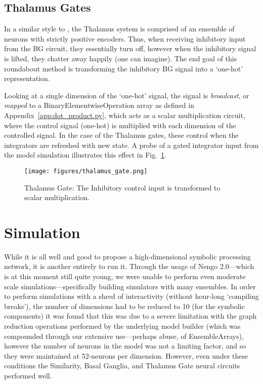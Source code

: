 \documentclass{report}
\begin{document}
\section{Thalamus Gates}
In a similar style to \cite{stewart2011a}, the Thalamus system is comprised of an ensemble of neurons with strictly positive encoders.
Thus, when receiving inhibitory input from the BG circuit, they essentially turn off, however when the inhibitory signal is lifted, they chatter away happily (one can imagine).
The end goal of this roundabout method is transforming the inhibitory BG signal into a \lq{}one-hot\rq{} representation.

Looking at a single dimension of the \lq{}one-hot\rq{} signal, the signal is \emph{broadcast}, or \emph{mapped} to a BinaryElementwiseOperation array as defined in Appendix~\ref{app:dot_product.py}, which acts as a scalar multiplication circuit, where the control signal (one-hot) is multiplied with each dimension of the controlled signal.
In the case of the Thalamus gates, these control when the integrators are refreshed with new state.
A probe of a gated integrator input from the model simulation illustrates this effect in Fig.~\ref{fig:thalamus_gate_sim}.

\begin{figure}[H]
\centering
\texttt{[image: figures/thalamus\_gate.png]}
\caption{Thalamus Gate: The Inhibitory control input is transformed to scalar multiplication.}
\label{fig:thalamus_gate_sim}
\end{figure}

\chapter{Simulation}
While it is all well and good to propose a high-dimensional symbolic processing network, it is another entirely to run it.
Through the usage of Nengo 2.0---which is at this moment still quite young, we were unable to perform even moderate scale simulations---specifically building simulators with many ensembles.
In order to perform simulations with a shred of interactivity (without hour-long \lq{}compiling breaks\rq{}), the number of dimensions had to be reduced to 10 (for the symbolic components) it was found that this was due to a severe limitation with the graph reduction operations performed by the underlying model builder (which was compounded through our extensive use---perhaps abuse, of EnsembleArrays), however the number of neurons in the model was not a limiting factor, and so they were maintained at 52-neurons per dimension.
However, even under these conditions the Similarity, Basal Ganglia, and Thalamus Gate neural circuits performed well.
\end{document}
